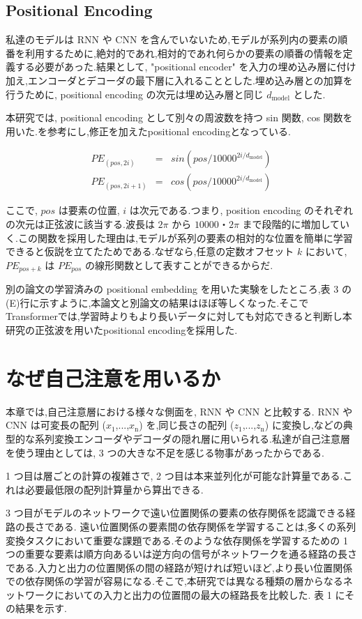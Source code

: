 \documentclass{jarticle}     %
\begin{document}
\subsection{Positional Encoding}
私達のモデルは RNN や CNN を含んでいないため,モデルが系列内の要素の順番を利用するために,絶対的であれ,相対的であれ何らかの要素の順番の情報を定義する必要があった.結果として, "positional encoder" を入力の埋め込み層に付け加え,エンコーダとデコーダの最下層に入れることとした.埋め込み層との加算を行うために, positional encoding の次元は埋め込み層と同じ $d_\mathrm{model}$ とした.\par
本研究では, positional encoding として別々の周波数を持つ sin 関数, cos 関数を用いた.\cite{8}を参考にし,修正を加えたpositional encodingとなっている.

\begin{eqnarray*}
  PE_{(pos,2i)} &= &sin(pos/10000^{2i/d_\mathrm{model}}) \\
  PE_{(pos,2i+1)} &= &cos(pos/10000^{2i/d_\mathrm{model}})
\end{eqnarray*}

ここで, $pos$ は要素の位置, $i$ は次元である.つまり, position encoding のそれぞれの次元は正弦波に該当する.波長は $2\pi$ から $10000・2\pi$ まで段階的に増加していく.この関数を採用した理由は,モデルが系列の要素の相対的な位置を簡単に学習できると仮説を立てたためである.なぜなら,任意の定数オフセット $k$ において, $PE_{pos+k}$ は $PE_{pos}$ の線形関数として表すことができるからだ.\par
別の論文の学習済みの positional embedding\cite{8} を用いた実験をしたところ,表 3 の(E)行に示すように,本論文と別論文の結果はほぼ等しくなった.そこでTransformerでは,学習時よりもより長いデータに対しても対応できると判断し本研究の正弦波を用いたpositional encodingを採用した.


\section{なぜ自己注意を用いるか}

本章では,自己注意層における様々な側面を, RNN や CNN と比較する. RNN や CNN は可変長の配列
 ($x_\mathrm{1}$,...,$x_\mathrm{n}$) を,同じ長さの配列 ($z_\mathrm{1}$,...,$z_\mathrm{n}$) に変換し,などの典型的な系列変換エンコーダやデコーダの隠れ層に用いられる.私達が自己注意層を使う理由としては, 3 つの大きな不足を感じる物事があったからである.
\par
1 つ目は層ごとの計算の複雑さで, 2 つ目は本来並列化が可能な計算量である.これは必要最低限の配列計算量から算出できる.
\par
 3 つ目がモデルのネットワークで遠い位置関係の要素の依存関係を認識できる経路の長さである.
遠い位置関係の要素間の依存関係を学習することは,多くの系列変換タスクにおいて重要な課題である.そのような依存関係を学習するための 1 つの重要な要素は順方向あるいは逆方向の信号がネットワークを通る経路の長さである.入力と出力の位置関係の間の経路が短ければ短いほど,より長い位置関係での依存関係の学習が容易になる\cite{11}.そこで,本研究では異なる種類の層からなるネットワークにおいての入力と出力の位置間の最大の経路長を比較した. 表 1 にその結果を示す.
\end{document}
